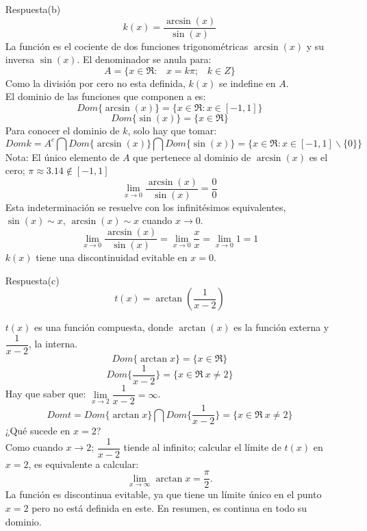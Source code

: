 \documentclass[10pt,twoside]{SelfArx} %
\begin{document}
\begin{enumerate}
\begin{enumerate}
	
	\item[Respuesta(b)]
	\[ k(x)=\dfrac{\arcsin(x)}{\sin(x)} \]
	La función es el cociente de dos funciones trigonométricas $ \arcsin(x) $ y  su inversa $ \sin(x) $. El denominador se anula para:
	\[ A=\{x\in\Re:\;\;\; x=k\pi;\;\;\; k\in Z\} \]
	Como la división por cero no esta definida, $ k(x) $ se indefine en $ A $.\\
	El dominio de las funciones que componen a es:
	\[ Dom\{\arcsin(x)\}=\{x\in\Re: x\in[-1,1] \} \]
	\[ Dom\{\sin(x)\}=\{x\in\Re \} \]
	Para conocer el dominio de $ k $, solo hay que tomar:
	\[ Dom k=A^{c}\bigcap Dom\{\arcsin(x)\}\bigcap Dom\{\sin(x)\}=\{x\in\Re: x\in[-1,1] \backslash \{0\} \} \]
	Nota: El \'unico elemento de $ A $ que pertenece al dominio de $ \arcsin(x) $ es el cero;
 $ \pi\approx 3.14 \notin [-1,1] $
 \[ \lim\limits_{x\rightarrow0}\dfrac{\arcsin(x)}{\sin(x)}=\dfrac{0}{0} \]
 Esta indeterminaci\'on se resuelve con los infinit\'esimos equivalentes, $ \sin(x)\sim x $, $ \arcsin(x)\sim x $ cuando $ x\rightarrow0 $.
	 \[ \lim\limits_{x\rightarrow0}\dfrac{\arcsin(x)}{\sin(x)}=\lim\limits_{x\rightarrow0}\frac{x}{x}=\lim\limits_{x\rightarrow0}1=1 \]
	 $ k(x) $ tiene una discontinuidad evitable en $ x=0 $.\\

	\item[Respuesta(c)]
	\[ t(x)=\arctan(\dfrac{1}{x-2}) \]
	
	$ t(x) $ es una función compuesta, donde $ \arctan(x) $ es la función externa y $ \dfrac{1}{x-2} $, la interna.
	\[ Dom\{\arctan x\} =\{x\in\Re\}\]
	\[ Dom\{\dfrac{1}{x-2}\}=\{ x\in\Re\:x\neq2 \}\] 
	Hay que saber que: $ \lim\limits_{x\rightarrow2}\dfrac{1}{x-2}=\infty $.
	\[ Dom t= Dom\{\arctan x\}\bigcap Dom\{\dfrac{1}{x-2}\}=\{ x\in\Re\:x\neq2 \} \]
	¿Qué sucede en $ x=2 $?\\
	Como cuando $ x\rightarrow2 $; $ \dfrac{1}{x-2} $ tiende al infinito; calcular el l\'imite de $ t(x) $ en $ x=2 $, es equivalente a calcular:
	\[ \lim\limits_{x\rightarrow\infty}\arctan x =\dfrac{\pi}{2}. \]
	La función es discontinua evitable, ya que tiene un límite  único en el punto $ x=2 $ pero no está definida en este. En resumen, es continua en todo su dominio.
	
	
\end{enumerate}	
\end{enumerate}
\end{document}

